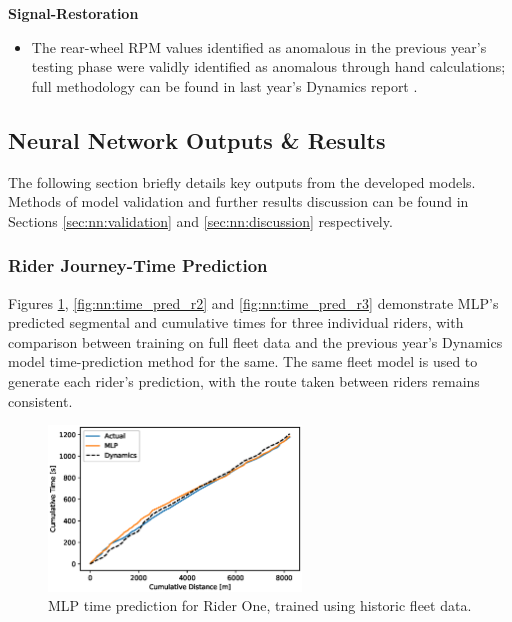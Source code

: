 \documentclass[a4paper, 10pt]{article}
\numberwithin{equation}{section}
\begin{document}
\textbf{Signal-Restoration}
\begin{itemize}
    \item The rear-wheel RPM values identified as anomalous in the previous year's testing phase were validly identified as anomalous through hand calculations; full methodology can be found in last year's Dynamics report \cite{report:dynamics}.
\end{itemize}


\subsection{Neural Network Outputs \& Results}
The following section briefly details key outputs from the developed models. Methods of model validation and further results discussion can be found in Sections \ref{sec:nn:validation} and \ref{sec:nn:discussion} respectively.

\subsubsection{Rider Journey-Time Prediction}
Figures \ref{fig:nn:time_pred_r1}, \ref{fig:nn:time_pred_r2} and \ref{fig:nn:time_pred_r3} demonstrate MLP's predicted segmental and cumulative times for three individual riders, with comparison between training on full fleet data and the previous year's Dynamics model time-prediction method for the same. The same fleet model is used to generate each rider's prediction, with the route taken between riders remains consistent.
\begin{figure}[h!]
    \centering
    \includegraphics[width=0.6\textwidth]{images/NN_TestRide/CM_Cumulative_Time.eps}
    \caption{MLP time prediction for Rider One, trained using historic fleet data.}
    \label{fig:nn:time_pred_r1}
\end{figure}
\end{document}
